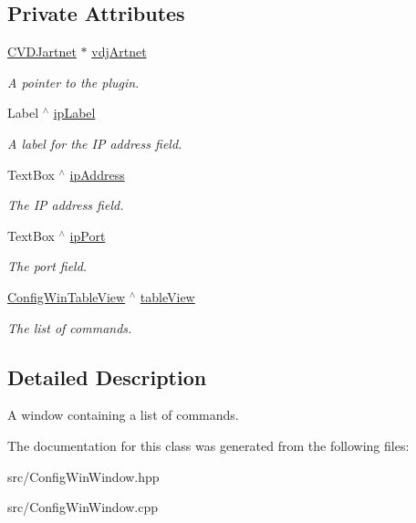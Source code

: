 \subsection*{Private Attributes}
\begin{DoxyCompactItemize}
\item 
\mbox{\label{classConfigWinWindow_add13d144a5a011195cedd76ed259ecff}} 
\hyperlink{classCVDJartnet}{C\+V\+D\+Jartnet} $\ast$ \hyperlink{classConfigWinWindow_add13d144a5a011195cedd76ed259ecff}{vdj\+Artnet}
\begin{DoxyCompactList}\small\item\em A pointer to the plugin. \end{DoxyCompactList}\item 
\mbox{\label{classConfigWinWindow_aaa2e34f0cf75b85f6da371baa86e4eac}} 
Label $^\wedge$ \hyperlink{classConfigWinWindow_aaa2e34f0cf75b85f6da371baa86e4eac}{ip\+Label}
\begin{DoxyCompactList}\small\item\em A label for the IP address field. \end{DoxyCompactList}\item 
\mbox{\label{classConfigWinWindow_af41aee8bafd96f1e86fbc900dccadc45}} 
Text\+Box $^\wedge$ \hyperlink{classConfigWinWindow_af41aee8bafd96f1e86fbc900dccadc45}{ip\+Address}
\begin{DoxyCompactList}\small\item\em The IP address field. \end{DoxyCompactList}\item 
\mbox{\label{classConfigWinWindow_a383e4fe684dbe4e040cfcee7ec2034d9}} 
Text\+Box $^\wedge$ \hyperlink{classConfigWinWindow_a383e4fe684dbe4e040cfcee7ec2034d9}{ip\+Port}
\begin{DoxyCompactList}\small\item\em The port field. \end{DoxyCompactList}\item 
\mbox{\label{classConfigWinWindow_a16003ab2a1160a652d4cc1a17075d7e4}} 
\hyperlink{classConfigWinTableView}{Config\+Win\+Table\+View} $^\wedge$ \hyperlink{classConfigWinWindow_a16003ab2a1160a652d4cc1a17075d7e4}{table\+View}
\begin{DoxyCompactList}\small\item\em The list of commands. \end{DoxyCompactList}\end{DoxyCompactItemize}


\subsection{Detailed Description}
A window containing a list of commands. 

The documentation for this class was generated from the following files\+:\begin{DoxyCompactItemize}
\item 
src/Config\+Win\+Window.\+hpp\item 
src/Config\+Win\+Window.\+cpp\end{DoxyCompactItemize}
